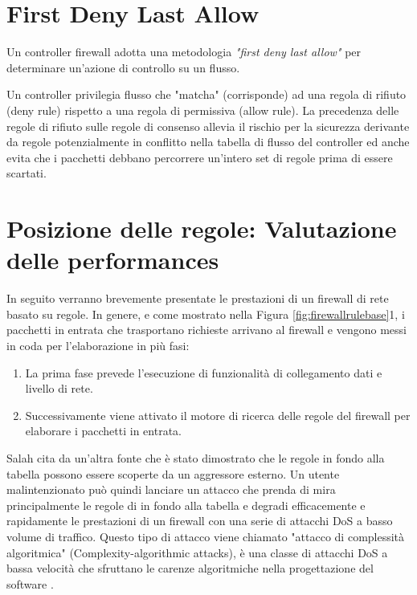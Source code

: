 \section{First Deny Last Allow}
Un controller firewall adotta una metodologia \textit{"first deny last allow"} per determinare un'azione di controllo su un flusso.

Un controller privilegia flusso che "matcha" (corrisponde) ad una regola di rifiuto (deny rule) rispetto a una regola di permissiva (allow rule). La precedenza delle regole di rifiuto sulle regole di consenso allevia il rischio per la sicurezza derivante da regole potenzialmente in conflitto nella tabella di flusso del controller ed anche evita che i pacchetti debbano percorrere un'intero set di regole prima di essere scartati.


\section{Posizione delle regole: Valutazione delle performances}

In seguito verranno brevemente presentate le prestazioni di un firewall di rete basato su regole. In genere, e come mostrato nella Figura \ref{fig:firewallrulebase}1, i pacchetti in entrata che trasportano richieste arrivano al firewall e vengono messi in coda per l'elaborazione in più fasi:

\begin{enumerate}
  \item La prima fase prevede l'esecuzione di funzionalità di collegamento dati e livello di rete.
  \item Successivamente viene attivato il motore di ricerca delle regole del firewall per elaborare i pacchetti in entrata.
\end{enumerate}

Salah cita da un'altra fonte \cite{salah2011performance} che è stato dimostrato che le regole in fondo alla tabella possono essere scoperte da un aggressore esterno. Un utente malintenzionato può quindi lanciare un attacco che prenda di mira principalmente le regole di in fondo alla tabella e degradi efficacemente e rapidamente le prestazioni di un firewall con una serie di attacchi DoS a basso volume di traffico. Questo tipo di attacco viene chiamato "attacco di complessità algoritmica" (Complexity-algorithmic attacks), è una classe di attacchi DoS a bassa velocità che sfruttano le carenze algoritmiche nella progettazione del software \cite{salah2011performance}.


